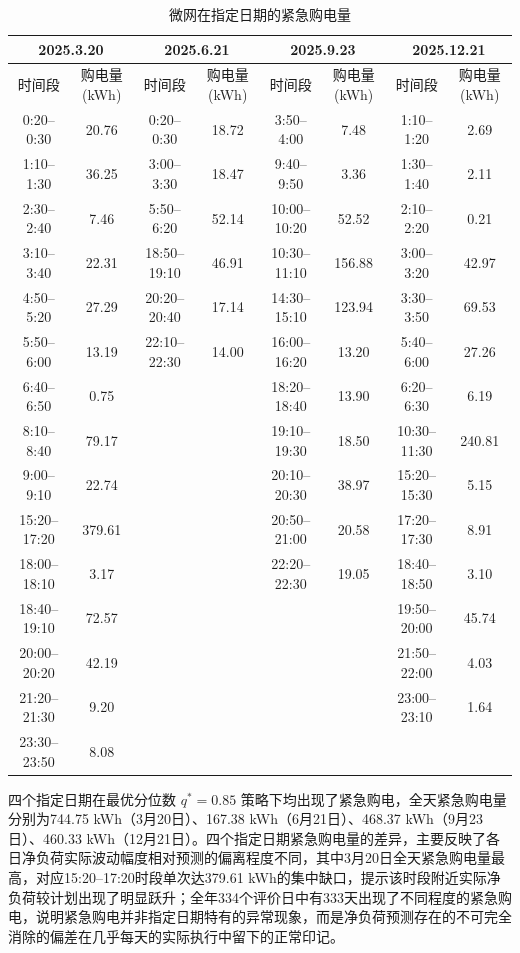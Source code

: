 \begin{table}[H]
  \centering
  \caption{微网在指定日期的紧急购电量}
  \label{tab:q2-specific-days}
  \tiny
  \setlength{\tabcolsep}{3pt}
  \renewcommand{\arraystretch}{1.2}
  \begin{tabular}{|c|c|c|c|c|c|c|c|}
    \hline
    \multicolumn{2}{|c|}{2025.3.20}
    & \multicolumn{2}{c|}{2025.6.21}
    & \multicolumn{2}{c|}{2025.9.23}
    & \multicolumn{2}{c|}{2025.12.21} \\
    \hline
    时间段 & 购电量(kWh) & 时间段 & 购电量(kWh)
    & 时间段 & 购电量(kWh) & 时间段 & 购电量(kWh) \\
    \hline
    0:20--0:30 & 20.76 & 0:20--0:30 & 18.72 & 3:50--4:00 & 7.48 & 1:10--1:20 & 2.69 \\
    \hline
    1:10--1:30 & 36.25 & 3:00--3:30 & 18.47 & 9:40--9:50 & 3.36 & 1:30--1:40 & 2.11 \\
    \hline
    2:30--2:40 & 7.46 & 5:50--6:20 & 52.14 & 10:00--10:20 & 52.52 & 2:10--2:20 & 0.21 \\
    \hline
    3:10--3:40 & 22.31 & 18:50--19:10 & 46.91 & 10:30--11:10 & 156.88 & 3:00--3:20 & 42.97 \\
    \hline
    4:50--5:20 & 27.29 & 20:20--20:40 & 17.14 & 14:30--15:10 & 123.94 & 3:30--3:50 & 69.53 \\
    \hline
    5:50--6:00 & 13.19 & 22:10--22:30 & 14.00 & 16:00--16:20 & 13.20 & 5:40--6:00 & 27.26 \\
    \hline
    6:40--6:50 & 0.75 & & & 18:20--18:40 & 13.90 & 6:20--6:30 & 6.19 \\
    \hline
    8:10--8:40 & 79.17 & & & 19:10--19:30 & 18.50 & 10:30--11:30 & 240.81 \\
    \hline
    9:00--9:10 & 22.74 & & & 20:10--20:30 & 38.97 & 15:20--15:30 & 5.15 \\
    \hline
    15:20--17:20 & 379.61 & & & 20:50--21:00 & 20.58 & 17:20--17:30 & 8.91 \\
    \hline
    18:00--18:10 & 3.17 & & & 22:20--22:30 & 19.05 & 18:40--18:50 & 3.10 \\
    \hline
    18:40--19:10 & 72.57 & & & & & 19:50--20:00 & 45.74 \\
    \hline
    20:00--20:20 & 42.19 & & & & & 21:50--22:00 & 4.03 \\
    \hline
    21:20--21:30 & 9.20 & & & & & 23:00--23:10 & 1.64 \\
    \hline
    23:30--23:50 & 8.08 & & & & & & \\
    \hline
  \end{tabular}
\end{table}

四个指定日期在最优分位数 $q^\ast=0.85$ 策略下均出现了紧急购电，全天紧急购电量分别为744.75 kWh（3月20日）、167.38 kWh（6月21日）、468.37 kWh（9月23日）、460.33 kWh（12月21日）。四个指定日期紧急购电量的差异，主要反映了各日净负荷实际波动幅度相对预测的偏离程度不同，其中3月20日全天紧急购电量最高，对应15:20--17:20时段单次达379.61 kWh的集中缺口，提示该时段附近实际净负荷较计划出现了明显跃升；全年334个评价日中有333天出现了不同程度的紧急购电，说明紧急购电并非指定日期特有的异常现象，而是净负荷预测存在的不可完全消除的偏差在几乎每天的实际执行中留下的正常印记。

